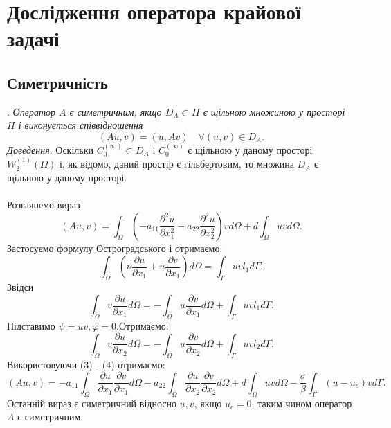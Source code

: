 \documentclass[12pt,a4paper, twoside]{article}
\begin{document}
\section{Дослідження оператора крайової задачі}
{
\subsection{Симетричність}
{
{.} \textit{Оператор $A $ є симетричним, якщо $D_{A} \subset H$  є щільною множиною у просторі $H$ і виконується співвідношення}
$$
(A u, v)=(u, A v) \quad \forall(u, v) \in D_{A}.
$$
\textit{Доведення}. Оскільки  $C_{0}^{(\infty)} \subset D_{A}$ i $C_{0}^{(\infty)}$ є щільною у даному просторі $W_{2}^{(1)}(\Omega)$ і, як відомо, даний простір є гільбертовим, то множина  $D_{A}$ є щільною у даному просторі.\\\\
Розглянемо вираз
$$
(A u, v)=\int_{\Omega}^{}\left(-a_{11} \frac{\partial^{2} u}{\partial x_{1}^{2}}-a_{22} \frac{\partial^{2} u}{\partial x_{2}^{2}}\right) v d \Omega+d \int_{\Omega} u v d \Omega.
$$
Застосуємо формулу Остроградського і отримаємо:
$$\int_{\Omega}\left(\nu \frac{\partial u}{\partial x_{1}}+u \frac{\partial v}{\partial x_{1}}\right) d \Omega=\int_{\Gamma} u v l_{1} d \Gamma.$$
Звідси
\begin{equation}\int_{\Omega} v \frac{\partial u}{\partial x_{1}} d \Omega=-\int_{\Omega} u \frac{\partial v}{\partial x_{1}} d \Omega+\int_{\Gamma} u v l_{1} d \Gamma.\end{equation}
Підставимо $\psi=u v, \varphi=0$.Отримаємо:
\begin{equation}\int_{\Omega} v \frac{\partial u}{\partial x_{2}} d \Omega=-\int_{\Omega} u \frac{\partial v}{\partial x_{2}} d \Omega+\int_{\Gamma} u v l_{2} d \Gamma.\end{equation}
Використовуючи (3) - (4) отримаємо: 
$$(A u, v)=-a_{11} \int_{\Omega} \frac{\partial u}{\partial x_{1}} \frac{\partial v}{\partial x_{1}} d \Omega-a_{22} \int_{\Omega} \frac{\partial u}{\partial x_{2}} \frac{\partial v}{\partial x_{2}} d \Omega+d \int_{\Omega} u v d \Omega-\frac{\sigma}{\beta} \int_{\Gamma}\left(u-u_{c}\right) v d \Gamma.$$
Останній вираз є симетричний відносно $u,v$, якщо $u_c=0$, таким чином оператор $A$ є симетричним.
}
}
\end{document}

